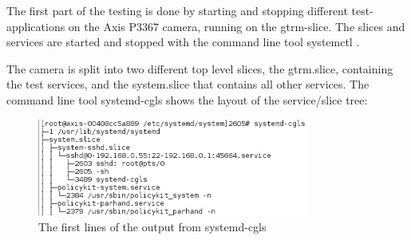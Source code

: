 \documentclass[nobiblatex]{LTHthesis}
\begin{document}

The first part of the testing is done by starting and stopping different test-applications on the Axis P3367 camera, running on the gtrm-slice.
The slices and services are started and stopped with the command line tool systemctl \cite{systemctl}.

The camera is split into two different top level slices, the gtrm.slice, containing the test services, and the system.slice that contains all other services. The command line tool systemd-cgls shows the layout of the service/slice tree:

\begin{figure}[h]
    \centering
    \includegraphics[width=0.8\textwidth]{systemd-cgls2}
    \caption{The first lines of the output from  systemd-cgls}
    \label{fig:systemd-cgls2}
\end{figure}
\end{document}
